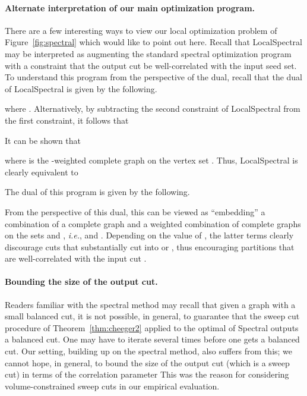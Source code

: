 \documentclass[11pt]{article}
\begin{document}
\paragraph{Alternate interpretation of our main optimization program.}
There are a few interesting ways to view our local optimization problem 
of Figure~\ref{fig:spectral} which would like to point out here. 
Recall that \textsf{LocalSpectral} may be interpreted as augmenting the 
standard spectral optimization program with a constraint that the output 
cut be well-correlated with the input seed set.
To understand this program from the perspective of the dual, recall that 
the dual of \textsf{LocalSpectral} is given by the following.

where .
Alternatively, by subtracting the second constraint of 
\textsf{LocalSpectral} 
from the first constraint, it follows that

It can be shown that

where  is the -weighted complete graph on the vertex set .
Thus,
\textsf{LocalSpectral}
is clearly equivalent to

The dual of 
this program 
is given by the following.

From the perspective of this dual, this 
can be viewed as ``embedding'' a combination of a complete graph  and a
weighted combination of complete graphs on the sets  and , 
\emph{i.e.},  and .
Depending on the value of , the latter terms clearly discourage cuts 
that substantially cut into  or , thus encouraging partitions
that are well-correlated with the input cut .


\paragraph{Bounding the size of the output cut.}
Readers familiar with the spectral method may recall that given a graph with a small balanced cut, it is not possible, in general, to guarantee that the sweep cut procedure of Theorem~\ref{thm:cheeger2}  applied to the optimal of \textsf{Spectral} outputs  a balanced cut. One may have to iterate several times before one gets a balanced cut.  Our setting, building up on the spectral method,  also suffers from this;  we cannot hope, in general,  to bound the size of the output cut  (which is a sweep cut) in terms of the correlation parameter  
This was the reason for considering volume-constrained sweep cuts in our
empirical evaluation.
\end{document}
